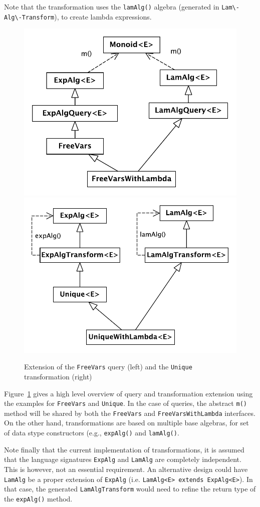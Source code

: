 
Note that the transformation uses the \lstinline{lamAlg()} algebra (generated in \lstinline{Lam\-Alg\-Transform}),
to create lambda expressions.


\begin{figure}[t]
  \centering

  \includegraphics[width=0.45\linewidth]{extendQuery}
  \hspace*{2pt}
  \vline
  \hspace*{2pt}
  \includegraphics[width=0.45\linewidth]{extendTransform}
  
  \caption{Extension of the \lstinline{FreeVars} query (left) and the \lstinline{Unique} transformation (right)}
  \label{FIG:extension}
\end{figure}


Figure~\ref{FIG:extension} gives a high level overview of query and transformation extension using the examples for \lstinline{FreeVars} and \lstinline{Unique}. 
In the case of queries, the abstract \lstinline{m()} method will be shared by both the \lstinline{FreeVars} and \lstinline{FreeVarsWithLambda} interfaces.
On the other hand, transformations are based on multiple base algebras, for set of data stype constructors (e.g., \lstinline{expAlg()} and \lstinline{lamAlg()}. 

Note finally that the current implementation of \name transformations, it is assumed that the language signatures \lstinline{ExpAlg} and \lstinline{LamAlg} are completely independent.
This is however, not an essential requirement.
An alternative design could have \lstinline{LamAlg} be a proper extension of \lstinline{ExpAlg} (i.e. \lstinline{LamAlg<E> extends ExpAlg<E>}).
In that case, the generated \lstinline{LamAlgTransform} would need to refine the return type of the \lstinline{expAlg()} method. 


